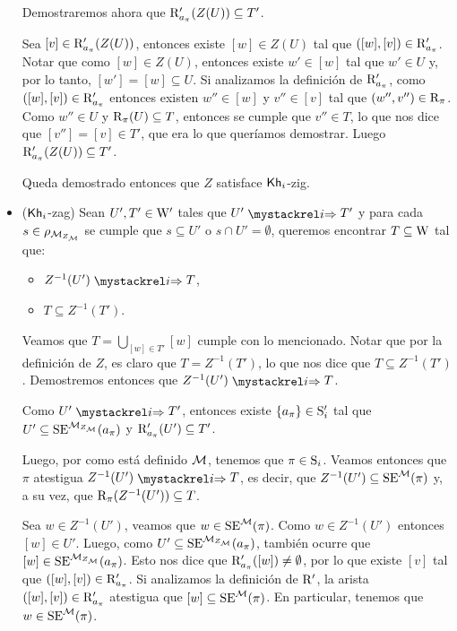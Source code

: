 \begin{demostracion}
\begin{itemize}
        Demostraremos ahora que $\R'_{a_\pi}(Z(U)) \subseteq T'$.

        Sea $[v] \in \R'_{a_\pi}(Z(U))$, entonces existe $[w] \in Z(U)$ tal que $([w],[v]) \in \R'_{a_\pi}$. Notar que 
        como $[w] \in Z(U)$, entonces existe $w' \in [w]$ tal que $w' \in U$ y, por lo tanto, $[w'] = [w] \subseteq U$. 
        Si analizamos la definición de $\R'_{a_\pi}$, como $([w],[v]) \in \R'_{a_\pi}$ entonces existen $w'' \in [w]$ y $v'' \in [v]$ 
        tal que $(w'',v'') \in \R_\pi$. Como $w'' \in U$ y $\R_\pi(U) \subseteq T$, entonces se cumple que $v'' \in T$, lo que nos dice 
        que $[v''] = [v] \in T'$, que era lo que queríamos demostrar. Luego $\R'_{a_\pi}(Z(U)) \subseteq T'$. 

        Queda demostrado entonces que $Z$ satisface $\khi$-zig.

        \item ($\khi$-zag) Sean $U', T' \in \W'$ tales que $U' \ultsExecAgi T'$ y para cada $s \in \rho_{\fcont{\model}}$ se cumple que 
        $s \subseteq U'$ o $s \cap U' = \emptyset$, queremos encontrar $T \subseteq \W$ tal que:
        \begin{multicols}{2}
            \begin{itemize}
                \item $Z^{-1}(U') \ultsExecAgi T$, 
                \item $T \subseteq Z^{-1}(T')$.
            \end{itemize}
        \end{multicols}
        
        Veamos que $T = \bigcup\limits_{[w] \in T'} [w]$ cumple con lo mencionado. Notar que por la definición de $Z$, es claro que 
        $T = Z^{-1}(T')$, lo que nos dice que $T \subseteq Z^{-1}(T')$. Demostremos entonces que $Z^{-1}(U') \ultsExecAgi T$. 
    
        Como $U' \ultsExecAgi T'$, entonces existe $\{a_\pi\} \in \S_i'$ tal que $U' \subseteq \sexec^{\fcont{\model}}(a_\pi)$ 
        y $\R'_{a_\pi}(U') \subseteq T'$.

        Luego, por como está definido $\model$, tenemos que $\pi \in \S_i$. 
        Veamos entonces que $\pi$ atestigua $Z^{-1}(U') \ultsExecAgi T$, es decir, que 
        $Z^{-1}(U') \subseteq \sexec^{\model}(\pi)$ y, a su vez, que $\R_\pi(Z^{-1}(U')) \subseteq T$.

        Sea $w \in Z^{-1}(U')$, veamos que $w \in \sexec^{\model}(\pi)$. Como $w \in Z^{-1}(U')$ entonces $[w] \in U'$. Luego, 
        como $U' \subseteq \sexec^{\fcont{\model}}(a_\pi)$, también ocurre que $[w] \in \sexec^{\fcont{\model}}(a_\pi)$. Esto nos dice que 
        $\R'_{a_\pi}([w]) \neq \emptyset$, por lo que existe $[v]$ tal que $([w],[v]) \in \R'_{a_\pi}$. Si analizamos la definición de 
        $\R'$, la arista $([w],[v]) \in \R'_{a_\pi}$ atestigua que $[w] \subseteq \sexec^{\model}(\pi)$. En particular, tenemos que 
        $w \in \sexec^{\model}(\pi)$.


\end{itemize}
\end{demostracion}
